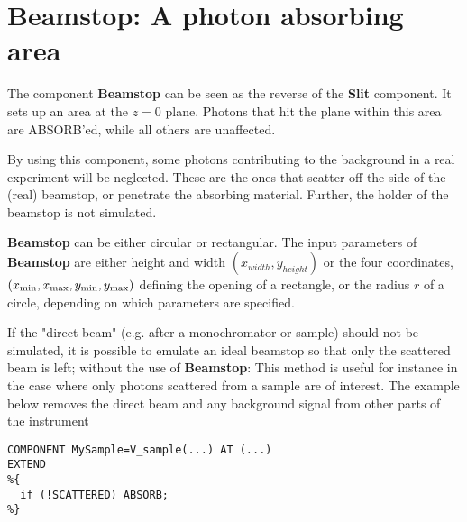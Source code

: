 \section{Beamstop: A photon absorbing area}
\label{beamstop}


The component {\bf Beamstop} can be seen as the reverse of
the {\bf Slit} component.
It sets up an area at the $z=0$ plane. Photons that hit the plane 
within this area are ABSORB'ed, while all others are unaffected.

By using this component, some photons contributing to the background
in a real experiment will be neglected.
These are the ones that scatter off the side
of the (real) beamstop, or penetrate the absorbing material.
Further, the holder of the beamstop is not simulated.

{\bf Beamstop} can be either circular or rectangular.
The input parameters of {\bf Beamstop} are either height and width $(x_{width},y_{height})$ or the four coordinates,
$(x_{\rm min}, x_{\rm max}, y_{\rm min}, y_{\rm max})$
defining the opening of a rectangle, or the radius $r$ of
a circle, depending on which parameters are specified.

If the "direct beam" (e.g. after a monochromator or sample) should not be
simulated, it is possible to emulate an ideal beamstop 
so that only the scattered beam is left;
without the use of {\bf Beamstop}:
This method is useful for instance in the case where only photons 
scattered from a sample are of interest. 
The example below removes the direct beam and 
any background signal from other parts of the instrument
\begin{verbatim}
COMPONENT MySample=V_sample(...) AT (...)
EXTEND
%{
  if (!SCATTERED) ABSORB;
%}
\end{verbatim}

